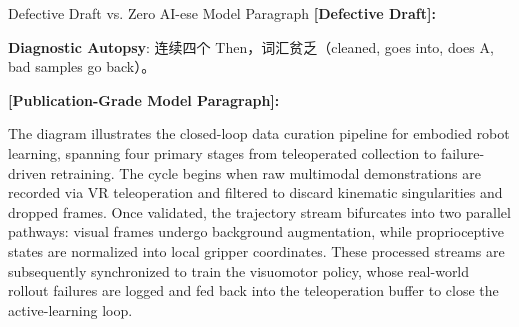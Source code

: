 \begin{ExampleBox}{Defective Draft vs. Zero AI-ese Model Paragraph}
\textbf{\color{TargetHighlight}[Defective Draft]:}\par
{}\par\vspace{4pt}
\textbf{Diagnostic Autopsy}: 连续四个 Then，词汇贫乏（cleaned, goes into, does A, bad samples go back）。\par\vspace{6pt}
\textbf{\color{AcadNavy}[Publication-Grade Model Paragraph]:}\par
The diagram illustrates the closed-loop data curation pipeline for embodied robot learning, spanning four primary stages from teleoperated collection to failure-driven retraining. The cycle begins when raw multimodal demonstrations are recorded via VR teleoperation and filtered to discard kinematic singularities and dropped frames. Once validated, the trajectory stream bifurcates into two parallel pathways: visual frames undergo background augmentation, while proprioceptive states are normalized into local gripper coordinates. These processed streams are subsequently synchronized to train the visuomotor policy, whose real-world rollout failures are logged and fed back into the teleoperation buffer to close the active-learning loop.
\end{ExampleBox}

